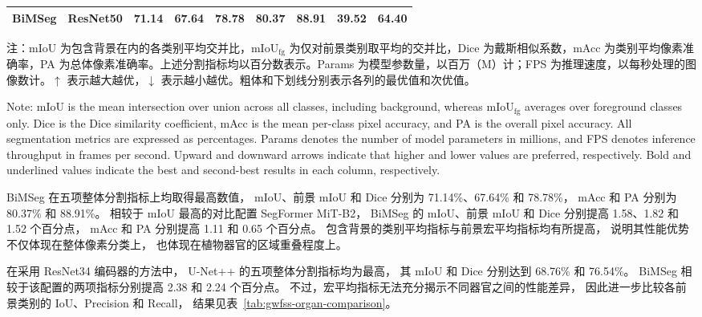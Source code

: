 \begin{table}[!htb]
\begin{spacing}{1.2}
\begin{tabular*}{\linewidth}{@{\extracolsep{\fill}}llrrrrrrr@{}}
      \midrule
      \textbf{BiMSeg} & ResNet50 & \textbf{71.14} & \textbf{67.64}
        & \textbf{78.78} & \textbf{80.37} & \textbf{88.91} & 39.52 & 64.40 \\
      \bottomrule
    \end{tabular*}
  \end{spacing}
  \par\vspace{8pt}
  \noindent\begin{minipage}{\linewidth}
    \normalfont{}\raggedright
    \noindent 注：mIoU 为包含背景在内的各类别平均交并比，\(\mathrm{mIoU}_{\mathrm{fg}}\) 为仅对前景类别取平均的交并比，Dice 为戴斯相似系数，mAcc 为类别平均像素准确率，PA 为总体像素准确率。上述分割指标均以百分数表示。Params 为模型参数量，以百万（M）计；FPS 为推理速度，以每秒处理的图像数计。\(\uparrow\) 表示越大越优，\(\downarrow\) 表示越小越优。粗体和下划线分别表示各列的最优值和次优值。\par
    \vspace{2pt}
    \noindent Note: mIoU is the mean intersection over union across all classes, including background, whereas \(\mathrm{mIoU}_{\mathrm{fg}}\) averages over foreground classes only. Dice is the Dice similarity coefficient, mAcc is the mean per-class pixel accuracy, and PA is the overall pixel accuracy. All segmentation metrics are expressed as percentages. Params denotes the number of model parameters in millions, and FPS denotes inference throughput in frames per second. Upward and downward arrows indicate that higher and lower values are preferred, respectively. Bold and underlined values indicate the best and second-best results in each column, respectively.\par
  \end{minipage}\par
\end{table}

BiMSeg 在五项整体分割指标上均取得最高数值，
mIoU、前景 mIoU 和 Dice 分别为
71.14\%、67.64\% 和 78.78\%，
mAcc 和 PA 分别为 80.37\% 和 88.91\%。
相较于 mIoU 最高的对比配置 SegFormer MiT-B2，
BiMSeg 的 mIoU、前景 mIoU 和 Dice
分别提高 1.58、1.82 和 1.52 个百分点，
mAcc 和 PA 分别提高 1.11 和 0.65 个百分点。
包含背景的类别平均指标与前景宏平均指标均有所提高，
说明其性能优势不仅体现在整体像素分类上，
也体现在植物器官的区域重叠程度上。

在采用 ResNet34 编码器的方法中，
U-Net++ 的五项整体分割指标均为最高，
其 mIoU 和 Dice 分别达到 68.76\% 和 76.54\%。
BiMSeg 相较于该配置的两项指标分别提高
2.38 和 2.24 个百分点。
不过，宏平均指标无法充分揭示不同器官之间的性能差异，
因此进一步比较各前景类别的 IoU、Precision 和 Recall，
结果见表~\ref{tab:gwfss-organ-comparison}。

